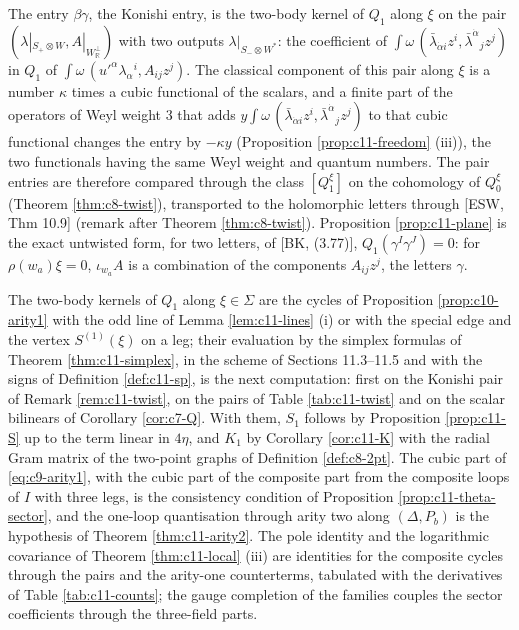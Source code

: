 \begin{remark}
The entry $\beta\gamma$, the Konishi entry, is the two-body kernel of $Q_1$ along $\xi$ on the pair $(\lambda|_{S_+\otimes W},A|_{W_{\mathbb R}^\perp})$ with two outputs $\lambda|_{S_-\otimes W^*}$: the coefficient of $\int\omega\,(\bar\lambda_{\dot\alpha i}z^i,\bar\lambda^{\dot\alpha}{}_jz^j)$ in $Q_1$ of $\int\omega\,(u'^\alpha\lambda_\alpha{}^i,A_{ij}z^j)$. The classical component of this pair along $\xi$ is a number $\kappa$ times a cubic functional of the scalars, and a finite part of the operators of Weyl weight $3$ that adds $y\int\omega\,(\bar\lambda_{\dot\alpha i}z^i,\bar\lambda^{\dot\alpha}{}_jz^j)$ to that cubic functional changes the entry by $-\kappa y$ (Proposition \ref{prop:c11-freedom} (iii)), the two functionals having the same Weyl weight and quantum numbers. The pair entries are therefore compared through the class $[Q^\xi_1]$ on the cohomology of $Q^\xi_0$ (Theorem \ref{thm:c8-twist}), transported to the holomorphic letters through [ESW, Thm 10.9] (remark after Theorem \ref{thm:c8-twist}). Proposition \ref{prop:c11-plane} is the exact untwisted form, for two letters, of [BK, (3.77)], $Q_1(\gamma^I\gamma^J)=0$: for $\rho(w_a)\xi=0$, $\iota_{w_a}A$ is a combination of the components $A_{ij}z^j$, the letters $\gamma$.
\end{remark}

\begin{remark}
\label{rem:c11-next}
The two-body kernels of $Q_1$ along $\xi\in\Sigma$ are the cycles of Proposition \ref{prop:c10-arity1} with the odd line of Lemma \ref{lem:c11-lines} (i) or with the special edge and the vertex $S^{(1)}(\xi)$ on a leg; their evaluation by the simplex formulas of Theorem \ref{thm:c11-simplex}, in the scheme of Sections 11.3--11.5 and with the signs of Definition \ref{def:c11-sp}, is the next computation: first on the Konishi pair of Remark \ref{rem:c11-twist}, on the pairs of Table \ref{tab:c11-twist} and on the scalar bilinears of Corollary \ref{cor:c7-Q}. With them, $S_1$ follows by Proposition \ref{prop:c11-S} up to the term linear in $4\eta$, and $K_1$ by Corollary \ref{cor:c11-K} with the radial Gram matrix of the two-point graphs of Definition \ref{def:c8-2pt}. The cubic part of \eqref{eq:c9-arity1}, with the cubic part of the composite part from the composite loops of $I$ with three legs, is the consistency condition of Proposition \ref{prop:c11-theta-sector}, and the one-loop quantisation through arity two along $(\Delta,P_b)$ is the hypothesis of Theorem \ref{thm:c11-arity2}. The pole identity and the logarithmic covariance of Theorem \ref{thm:c11-local} (iii) are identities for the composite cycles through the pairs and the arity-one counterterms, tabulated with the derivatives of Table \ref{tab:c11-counts}; the gauge completion of the families couples the sector coefficients through the three-field parts.
\end{remark}

